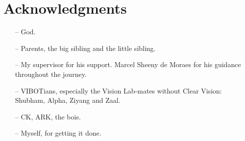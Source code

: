 \doublespacing

\setcounter{page}{1} \pagestyle{plain}


\tableofcontents

\listoffigures
\listoftables

\chapter*{Acknowledgments}
         {\protect{}}
\begin{itemize}
\item[--] God.
\item[--] Parents, the big sibling and the little sibling.
\item[--] My supervisor for his support. Marcel Sheeny de Moraes for his guidance throughout the journey.
\item[--] VIBOTians, especially the Vision Lab-mates without Clear Vision: Shubham, Alpha, Ziyang and Zaal.
\item[--] CK, ARK, the bois.
\item[--] Myself, for getting it done.
\end{itemize}

\pagestyle{fancy}